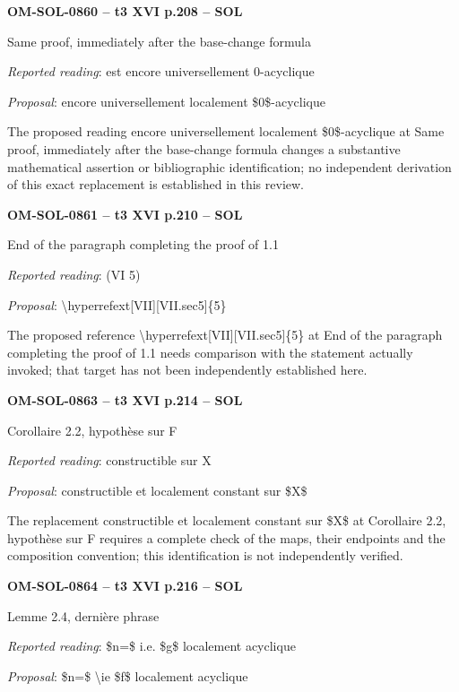 \par\noindent\textbf{OM-SOL-0860 -- t3 XVI p.208 -- SOL}\par
Same proof, immediately after the base-change formula\par
\emph{Reported reading}: est encore universellement 0-acyclique\par
\emph{Proposal}: encore universellement localement \$0\$-acyclique\par
The proposed reading encore universellement localement \$0\$-acyclique at Same proof, immediately after the base-change formula changes a substantive mathematical assertion or bibliographic identification; no independent derivation of this exact replacement is established in this review.\par
\par\noindent\textbf{OM-SOL-0861 -- t3 XVI p.210 -- SOL}\par
End of the paragraph completing the proof of 1.1\par
\emph{Reported reading}: (VI 5)\par
\emph{Proposal}: \textbackslash{}hyperrefext[VII][VII.sec5]\{5\}\par
The proposed reference \textbackslash{}hyperrefext[VII][VII.sec5]\{5\} at End of the paragraph completing the proof of 1.1 needs comparison with the statement actually invoked; that target has not been independently established here.\par
\par\noindent\textbf{OM-SOL-0863 -- t3 XVI p.214 -- SOL}\par
Corollaire 2.2, hypothèse sur F\par
\emph{Reported reading}: constructible sur X\par
\emph{Proposal}: constructible et localement constant sur \$X\$\par
The replacement constructible et localement constant sur \$X\$ at Corollaire 2.2, hypothèse sur F requires a complete check of the maps, their endpoints and the composition convention; this identification is not independently verified.\par
\par\noindent\textbf{OM-SOL-0864 -- t3 XVI p.216 -- SOL}\par
Lemme 2.4, dernière phrase\par
\emph{Reported reading}: \$n=\$ i.e. \$g\$ localement acyclique\par
\emph{Proposal}: \$n=\$ \textbackslash{}ie \$f\$ localement acyclique\par
